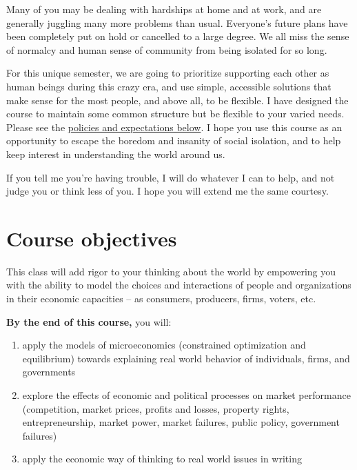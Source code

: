 \documentclass{article}
\providecommand{\tightlist}{%
  \setlength{\itemsep}{0pt}\setlength{\parskip}{0pt}}
\begin{document}
Many of you may be dealing with hardships at home and at work, and are
generally juggling many more problems than usual. Everyone's future
plans have been completely put on hold or cancelled to a large degree.
We all miss the sense of normalcy and human sense of community from
being isolated for so long.

For this unique semester, we are going to prioritize supporting each
other as human beings during this crazy era, and use simple, accessible
solutions that make sense for the most people, and above all, to be
flexible. I have designed the course to maintain some common structure
but be flexible to your varied needs. Please see the
\protect\hyperlink{policies-and-expectations}{policies and expectations
below}. I hope you use this course as an opportunity to escape the
boredom and insanity of social isolation, and to help keep interest in
understanding the world around us.

If you tell me you're having trouble, I will do whatever I can to help,
and not judge you or think less of you. I hope you will extend me the
same courtesy.

\hypertarget{course-objectives}{%
\section*{Course objectives}\label{course-objectives}}

This class will add rigor to your thinking about the world by empowering
you with the ability to model the choices and interactions of people and
organizations in their economic capacities -- as consumers, producers,
firms, voters, etc.

\textbf{By the end of this course,} you will:

\begin{enumerate}
\def\labelenumi{\arabic{enumi}.}
\tightlist
\item
  apply the models of microeconomics (constrained optimization and
  equilibrium) towards explaining real world behavior of individuals,
  firms, and governments
\item
  explore the effects of economic and political processes on market
  performance (competition, market prices, profits and losses, property
  rights, entrepreneurship, market power, market failures, public
  policy, government failures)
\item
  apply the economic way of thinking to real world issues in writing
\end{enumerate}
\end{document}
